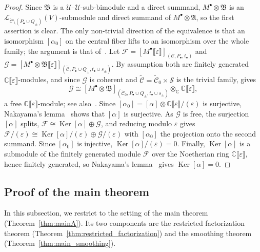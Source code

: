 \documentclass[12pt,a4paper,reqno]{amsart}
\numberwithin{equation}{section}
\theoremstyle{definition}
\renewcommand{\ker}{\operatorname{Ker}}
\newcommand{\C}{\mathbb{C}}
\renewcommand{\S}{\mathcal{S}}
\newcommand{\CCC}{\mathscr{C}}
\newcommand{\LL}{\mathcal{L}}
\newcommand{\lb}{\llbracket}
\newcommand{\rb}{\rrbracket}
\def\o{\otimes}
\def\scrU{\mathscr{U}}
\def\fA{\mathfrak{A}}
\def\fB{\mathfrak{B}}
\begin{document}
\begin{proof}
    Since $\fB$ is a $\scrU$--$\scrU$-sub-bimodule and a direct summand, $M^\bullet\o\fB$ is an $\LL_{\widetilde{\CCC}\setminus(P_\bullet\cup Q_\pm)}(V)$-submodule and direct summand of $M^\bullet\o\fA$, so the first assertion is clear. The only non-trivial direction of the equivalence is that an isomorphism $[\alpha_0]$ on the central fiber lifts to an isomorphism over the whole family; the argument is that of~\cite[Lemma 5.2.5]{DGK2}. Let $\mathcal{F}=[M^\bullet\lb \varepsilon\rb]_{(\CCC,P_\bullet, t_\bullet)}$ and $\mathcal{G}=[M^\bullet \otimes \fB \lb \varepsilon\rb ]_{(\widetilde{\CCC},P_\bullet \cup Q_\pm, t_\bullet \cup s_\pm)}$. By assumption both are finitely generated $\C\lb \varepsilon\rb$-modules, and since $\mathcal{G}$ is coherent and $\widetilde{\CCC}=\widetilde{\CCC}_0\times\S$ is the trivial family, \cite[Corollary 4.3.1]{DGK2} gives
    \[
    \mathcal{G}\cong[M^\bullet\o\fB]_{(\widetilde{\CCC}_0,P_\bullet\cup Q_\pm,t_\bullet\cup s_\pm)}\o_\C\C\lb \varepsilon\rb,
    \]
    a free $\C\lb \varepsilon\rb$-module; see also~\cite[Remark 5.2.4]{DGK2}. Since $[\alpha_0]=[\alpha]\otimes\C\lb\varepsilon\rb/(\varepsilon)$ is surjective, Nakayama's lemma~\cite[Theorem 2.2]{matsumura1989} shows that $[\alpha]$ is surjective. As $\mathcal{G}$ is free, the surjection $[\alpha]$ splits, $\mathcal{F}\cong\ker[\alpha]\oplus\mathcal{G}$, and reducing modulo $\varepsilon$ gives $\mathcal{F}/(\varepsilon)\cong\ker[\alpha]/(\varepsilon)\oplus\mathcal{G}/(\varepsilon)$ with $[\alpha_0]$ the projection onto the second summand. Since $[\alpha_0]$ is injective, $\ker[\alpha]/(\varepsilon)=0$. Finally, $\ker[\alpha]$ is a submodule of the finitely generated module $\mathcal{F}$ over the Noetherian ring $\C\lb\varepsilon\rb$, hence finitely generated, so Nakayama's lemma~\cite[Theorem 2.2]{matsumura1989} gives $\ker[\alpha]=0$.
\end{proof}


\subsection{Proof of the main theorem}
In this subsection, we restrict to the setting of the main theorem (Theorem~\ref{thm:mainA}). Its two components are the restricted factorization theorem (Theorem~\ref{thm:restricted_factorization}) and the smoothing theorem (Theorem~\ref{thm:main_smoothing}).
\end{document}
